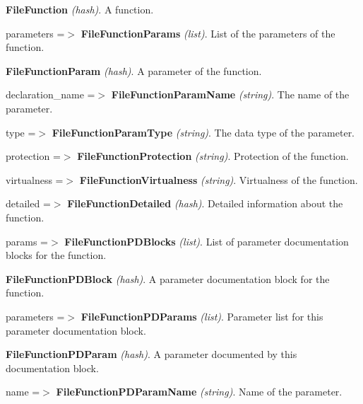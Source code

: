\begin{DoxyItemize}
\begin{DoxyItemize}
\begin{DoxyItemize}
\begin{DoxyItemize}
\begin{DoxyItemize}
\begin{DoxyItemize}
\item {\bfseries FileFunction} {\itshape (hash)\/}. A function. 
\begin{DoxyItemize}
\item parameters =$>$ {\bfseries FileFunctionParams} {\itshape (list)\/}. List of the parameters of the function. 
\begin{DoxyItemize}
\item {\bfseries FileFunctionParam} {\itshape (hash)\/}. A parameter of the function. 
\begin{DoxyItemize}
\item declaration\_\-name =$>$ {\bfseries FileFunctionParamName} {\itshape (string)\/}. The name of the parameter. 
\item type =$>$ {\bfseries FileFunctionParamType} {\itshape (string)\/}. The data type of the parameter. 
\end{DoxyItemize}
\end{DoxyItemize}
\item protection =$>$ {\bfseries FileFunctionProtection} {\itshape (string)\/}. Protection of the function. 
\item virtualness =$>$ {\bfseries FileFunctionVirtualness} {\itshape (string)\/}. Virtualness of the function. 
\item detailed =$>$ {\bfseries FileFunctionDetailed} {\itshape (hash)\/}. Detailed information about the function. 
\begin{DoxyItemize}
\item params =$>$ {\bfseries FileFunctionPDBlocks} {\itshape (list)\/}. List of parameter documentation blocks for the function. 
\begin{DoxyItemize}
\item {\bfseries FileFunctionPDBlock} {\itshape (hash)\/}. A parameter documentation block for the function. 
\begin{DoxyItemize}
\item parameters =$>$ {\bfseries FileFunctionPDParams} {\itshape (list)\/}. Parameter list for this parameter documentation block. 
\begin{DoxyItemize}
\item {\bfseries FileFunctionPDParam} {\itshape (hash)\/}. A parameter documented by this documentation block. 
\begin{DoxyItemize}
\item name =$>$ {\bfseries FileFunctionPDParamName} {\itshape (string)\/}. Name of the parameter. 
\end{DoxyItemize}

\end{DoxyItemize}
\end{DoxyItemize}
\end{DoxyItemize}
\end{DoxyItemize}
\end{DoxyItemize}
\end{DoxyItemize}
\end{DoxyItemize}
\end{DoxyItemize}
\end{DoxyItemize}
\end{DoxyItemize}
\end{DoxyItemize}

